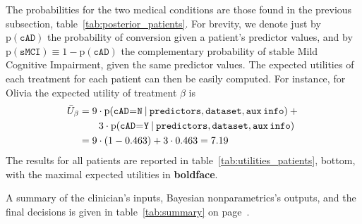 \documentclass[a4paper,12pt,%
onecolumn,oneside,article,%
british%
]{memoir}
\theoremstyle{remark}
\theoremstyle{innote}
\newcommand*{\p}{\mathrm{p}}%
\renewcommand*{\|}[1][]{\nonscript\:#1\vert\nonscript\:\mathopen{}}
\newcommand*{\mo}[1][=]{\mathclose{}\mathord{\nonscript\mkern0.5mu#1\nonscript\mkern0.5mu}\mathopen{}}
\newcommand*{\eU}{\bar{U}}
\newcommand*{\cad}{\texttt{cAD}}
\newcommand*{\smci}{\texttt{sMCI}}
\newcommand*{\yes}{\texttt{Y}}
\newcommand*{\no}{\texttt{N}}
\newcommand*{\predictors}{\texttt{predictors}}
\newcommand*{\dataset}{\texttt{dataset}}
\newcommand*{\auxinfo}{\texttt{aux\,info}}
\newcommand*{\mci}{Mild Cognitive Impairment}
\begin{document}
The probabilities for the two medical conditions are those found in the previous subsection, table~\ref{tab:posterior_patients}. For brevity, we denote just by $\p(\cad)$ the probability of conversion given a patient's predictor values, and by $\p(\smci)\equiv 1- \p(\cad)$ the complementary probability of stable \mci, given the same predictor values. The expected utilities of each treatment for each patient can then be easily computed. For instance, for Olivia the expected utility of treatment $\beta$ is
\begin{equation}
  \label{eq:utility_olivia_example}
  \begin{split}
  \eU_{\beta} &=
  9 \cdot \p(\cad\mo\no \| \predictors,\dataset,\auxinfo) +{}
  \\&\qquad
  3 \cdot \p(\cad\mo\yes \| \predictors,\dataset,\auxinfo)
  \\&=  9 \cdot (1-0.463) + 3 \cdot 0.463 = 7.19
\end{split}
\end{equation}
The results for all patients are reported in table~\ref{tab:utilities_patients}, bottom, with the maximal expected utilities in \textbf{boldface}.

A summary of the clinician's inputs, Bayesian nonparametrics's outputs, and the final decisions is given in table~\ref{tab:summary} on page~\pageref{tab:summary}.



 
\end{document}
